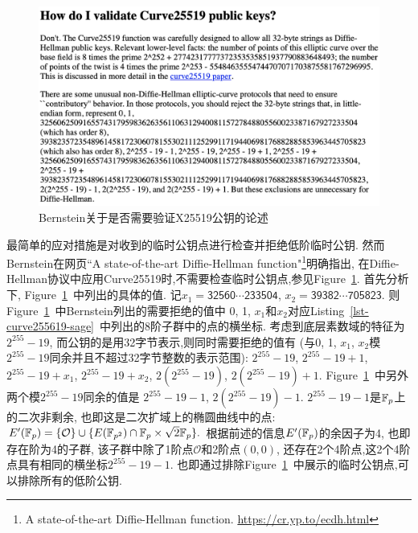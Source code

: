 \begin{figure}[h]
\centering
\includegraphics[width=\textwidth]{bernstein-validate-curve25519-pubkey.png}
\caption{Bernstein关于是否需要验证X25519公钥的论述\label{fig-validate-pubkey}}
\end{figure}

最简单的应对措施是对收到的临时公钥点进行检查并拒绝低阶临时公钥.
然而Bernstein在网页``A state-of-the-art Diffie-Hellman function"\footnote{
A state-of-the-art Diffie-Hellman function. \url{https://cr.yp.to/ecdh.html}}明确指出,
在Diffie-Hellman协议中应用Curve25519时,不需要检查临时公钥点,参见Figure~\ref{fig-validate-pubkey}. 
首先分析下, Figure~\ref{fig-validate-pubkey}~中列出的具体的值.
记$x_1 = \textsf{32560}\cdots\textsf{233504}$, $x_2 = \textsf{39382}\cdots\textsf{705823}$.
则Figure~\ref{fig-validate-pubkey}~中Bernstein列出的需要拒绝的值中
\textsf{0}, \textsf{1}, $x_1$和$x_2$对应Listing~\ref{lst-curve255619-sage}~中列出的8阶子群中的点的横坐标.
考虑到底层素数域的特征为$2^{255}-19$, 而公钥的是用32字节表示,则同时需要拒绝的值有
(与0, 1, $x_1$, $x_2$模$2^{255}-19$同余并且不超过32字节整数的表示范围):
$2^{255} - 19$,
$2^{255} - 19 + 1$,
$2^{255} - 19 + x_1$,
$2^{255} - 19 + x_2$,
$2(2^{255} - 19)$, 
$2(2^{255} - 19) + 1$.
Figure~\ref{fig-validate-pubkey}~中另外两个模$2^{255}-19$同余的值是
$2^{255} - 19 - 1$, $2(2^{255} - 19) - 1$.
$2^{255} - 19 - 1$是$\mathbb{F}_p$上的二次非剩余, 
也即这是二次扩域上的椭圆曲线中的点:
$E'(\mathbb{F}_{p}) = \{ \mathcal{O} \} \cup \{ E(\mathbb{F}_{p^2}) \cap \mathbb{F}_p \times \sqrt{2}\mathbb{F}_{p}\}.$
根据前述的信息$E'(\mathbb{F}_{p})$的余因子为4, 也即存在阶为4的子群, 
该子群中除了1阶点$\mathcal{O}$和2阶点$(0,0)$,
还存在2个4阶点,这2个4阶点具有相同的横坐标$2^{255} - 19 - 1$.
也即通过排除Figure~\ref{fig-validate-pubkey}~中展示的临时公钥点,可以排除所有的低阶公钥.

